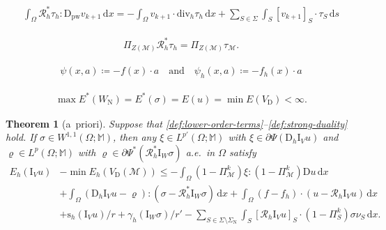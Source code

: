 \documentclass[10pt,a4paper]{amsart}
\newtheorem{theorem}{Theorem}
\newcommand{\D}{\mathrm{D}}
\newcommand{\I}{\mathrm{I}}
\newcommand{\M}{\mathbb{M}}
\newcommand{\Mcal}{\mathcal{M}}
\renewcommand{\d}[1]{\,\mathrm{d}#1}
\renewcommand{\div}{\mathrm{div}}
\newcommand{\pw}{\mathrm{pw}}
\newcommand{\s}{\mathrm{s}}
\begin{document}
\begin{align}\label{def:dual-pot-rec-1}
	\int_\Omega \mathcal{R}_h^* \tau_h : \D_\pw v_{k+1} \d{x} = - \int_\Omega v_{k+1} \cdot \div_h \tau_h \d{x} + \sum_{S \in \Sigma} \int_S [v_{k+1}]_S \cdot \tau_S \d{s}
\end{align}

\begin{align}\label{def:dual-pot-rec-2}
	\Pi_{Z(\Mcal)} \mathcal{R}_h^* \tau_h = \Pi_{Z(\Mcal)} \tau_\Mcal.
\end{align}

\begin{align}\label{def:lower-order-terms}
	\psi(x,a) \coloneqq -f(x) \cdot a \quad\text{and}\quad \psi_h(x,a) \coloneqq -f_h(x)\cdot a
\end{align}

\begin{align}\label{def:strong-duality}
	\max E^*(W_\mathrm{N}) = E^*(\sigma) = E(u) = \min E(V_\mathrm{D}) < \infty.
\end{align}

\begin{theorem}[a~priori]\label{thm:error-estimate}
	Suppose that \eqref{def:lower-order-terms}--\eqref{def:strong-duality} hold. If $\sigma \in W^{1,1}(\Omega; \M)$, then any $\xi \in L^{p'}(\Omega; \M)$ with
	$\xi \in \partial \Psi(\D_h \I_V u)$ and $\varrho \in L^p(\Omega; \M)$ with $\varrho \in \partial \Psi^*(\mathcal{R}_h^* \I_W \sigma)$ a.e.~in $\Omega$ satisfy
	\begin{align}\label{ineq:error-estimate}
		E_h(\I_V u) &- \min E_h(V_\mathrm{D}(\Mcal)) \leq -\int_\Omega (1 - \Pi_\Mcal^k) \xi:(1 - \Pi_\Mcal^k) \D u \d{x}\nonumber\\
		& + \int_\Omega (\D_h \I_V u - \varrho) : (\sigma - \mathcal{R}_h^* \I_W \sigma) \d{x} + \int_\Omega (f - f_h) \cdot (u - \mathcal{R}_h \I_V u) \d{x}\nonumber\\
		& + \s_h(\I_V u)/r + \gamma_h(\I_W \sigma)/r' - \sum_{S \in \Sigma \setminus \Sigma_\mathrm{N}} \int_S [\mathcal{R}_h \I_V u]_S \cdot (1 - \Pi_S^k)\sigma \nu_S \d{x}.
	\end{align}
\end{theorem}
\end{document}
